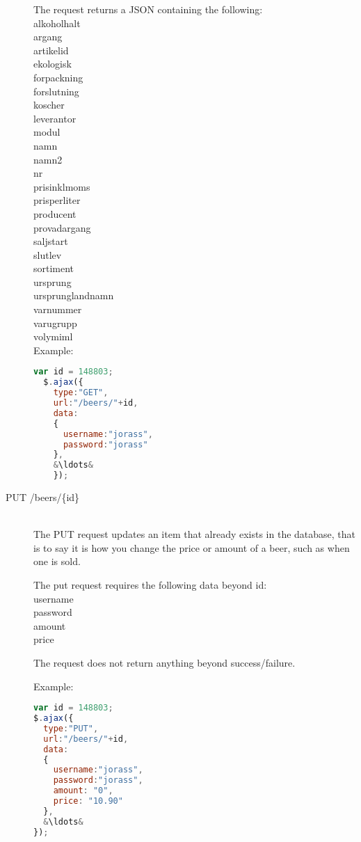 \documentclass[a4paper]{article}
\begin{document}
\begin{description}
    The request returns a JSON containing the following:\hfill\\
    alkoholhalt\hfill\\
    argang\hfill\\
    artikelid\hfill\\
    ekologisk\hfill\\
    forpackning\hfill\\
    forslutning\hfill\\
    koscher\hfill\\
    leverantor\hfill\\
    modul\hfill\\
    namn\hfill\\
    namn2\hfill\\
    nr\hfill\\
    prisinklmoms\hfill\\
    prisperliter\hfill\\
    producent\hfill\\
    provadargang\hfill\\
    saljstart\hfill\\
    slutlev\hfill\\
    sortiment\hfill\\
    ursprung\hfill\\
    ursprunglandnamn\hfill\\
    varnummer\hfill\\
    varugrupp\hfill\\
    volymiml\hfill\\

    Example:\hfill\\
    \begin{lstlisting}[language=javascript, frame=single, showstringspaces = false, basicstyle=\small\ttfamily, escapechar=\&]
  var id = 148803;
  $.ajax({
    type:"GET",
    url:"/beers/"+id,
    data:
    {
      username:"jorass",
      password:"jorass"
    },
    &\ldots&
    });
    \end{lstlisting}
    \item[PUT /beers/\{id\}]\hfill\\
      The PUT request updates an item that already exists in the database, that is to say it is how you change the price or amount of a beer, such as when one is sold.

      The put request requires the following data beyond id:\hfill\\
      username\hfill\\
      password\hfill\\
      amount\hfill\\
      price

      The request does not return anything beyond success/failure.

      Example: 
\newpage
    \begin{lstlisting}[language=javascript, frame=single, showstringspaces = false, basicstyle=\small\ttfamily, escapechar=\&]
var id = 148803;
$.ajax({
  type:"PUT",
  url:"/beers/"+id,
  data:
  {
    username:"jorass",
    password:"jorass",
    amount: "0",
    price: "10.90"
  },
  &\ldots&
});
    \end{lstlisting}
\end{description}
\end{document}
